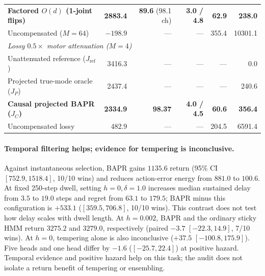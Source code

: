 \documentclass[twoside,11pt]{article}
\begin{document}
\begin{table}[t]
\begin{tabular}{lrrrrr}
\textbf{Factored $O(d)$ (1-joint flips)} & \textbf{2883.4} & \textbf{89.6} (98.1 ch) & \textbf{3.0 / 4.8} & \textbf{62.9} & \textbf{238.0} \\
Uncompensated ($M=64$) & $-198.9$ & --- & --- & 355.4 & 10301.1 \\
\midrule
\multicolumn{6}{l}{\emph{Lossy $0.5\times$ motor attenuation ($M=4$)}} \\
Unattenuated reference ($J_{\mathrm{ref}}$) & 3416.3 & --- & --- & --- & 0.0 \\
Projected true-mode oracle ($J_P$) & 2437.4 & --- & --- & --- & 240.6 \\
\textbf{Causal projected BAPR ($J_C$)} & \textbf{2334.9} & \textbf{98.37} & \textbf{4.0 / 4.5} & \textbf{60.6} & \textbf{356.4} \\
Uncompensated lossy & 482.9 & --- & --- & 204.5 & 6591.4 \\
\bottomrule
\end{tabular}
\end{table}

\paragraph{Temporal filtering helps; evidence for tempering is inconclusive.}
Against instantaneous selection, BAPR gains $1135.6$ return (95\% CI $[752.9,1518.4]$, 10/10 wins) and reduces action-error energy from $881.0$ to $100.6$. At fixed 250-step dwell, setting $h=0,\delta=1.0$ increases median sustained delay from $3.5$ to $19.0$ steps and regret from $63.1$ to $179.5$; BAPR minus this configuration is $+533.1$ ($[359.5,706.8]$, 10/10 wins). This contrast does not test how delay scales with dwell length. At $h=0.002$, BAPR and the ordinary sticky HMM return $3275.2$ and $3279.0$, respectively (paired $-3.7$ $[-22.3,14.9]$, 7/10 wins). At $h=0$, tempering alone is also inconclusive ($+37.5$ $[-100.8,175.9]$). Five heads and one head differ by $-1.6$ ($[-25.7,22.4]$) at positive hazard. Temporal evidence and positive hazard help on this task; the audit does not isolate a return benefit of tempering or ensembling.
\end{document}
